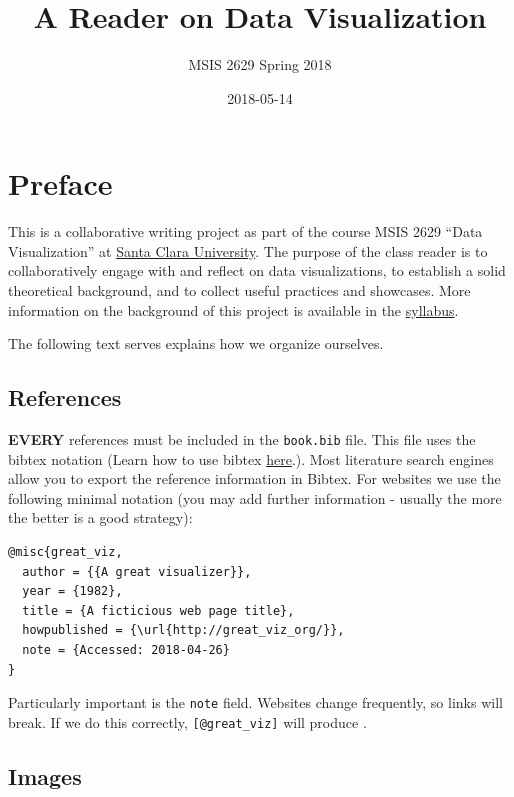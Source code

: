 \documentclass[]{book}
\title{A Reader on Data Visualization}
\author{MSIS 2629 Spring 2018}
\date{2018-05-14}
\theoremstyle{definition}
\theoremstyle{definition}
\theoremstyle{definition}
\theoremstyle{remark}
\begin{document}
\maketitle

{
\setcounter{tocdepth}{1}
\tableofcontents
}
\chapter{Preface}\label{preface}

This is a collaborative writing project as part of the course MSIS 2629
``Data Visualization'' at \href{http://www.scu.edu}{Santa Clara
University}. The purpose of the class reader is to collaboratively
engage with and reflect on data visualizations, to establish a solid
theoretical background, and to collect useful practices and showcases.
More information on the background of this project is available in the
\href{https://mschermann.github.io/msis2629spring2018}{syllabus}.

The following text serves explains how we organize ourselves.

\section{References}\label{references}

\textbf{EVERY} references must be included in the \texttt{book.bib}
file. This file uses the bibtex notation (Learn how to use bibtex
\href{http://www.bibtex.org/Using/}{here}.). Most literature search
engines allow you to export the reference information in Bibtex. For
websites we use the following minimal notation (you may add further
information - usually the more the better is a good strategy):

\begin{verbatim}
@misc{great_viz,
  author = {{A great visualizer}},
  year = {1982},
  title = {A ficticious web page title},
  howpublished = {\url{http://great_viz_org/}},
  note = {Accessed: 2018-04-26}
}
\end{verbatim}

Particularly important is the \texttt{note} field. Websites change
frequently, so links will break. If we do this correctly,
\texttt{{[}@great\_viz{]}} will produce \citep{great_viz}.

\section{Images}\label{images}
\end{document}
